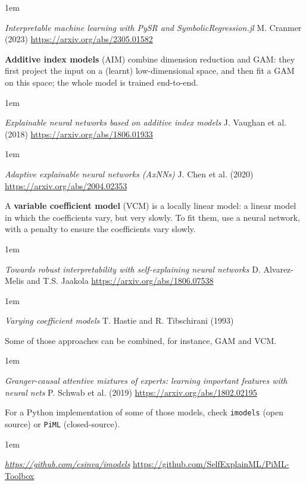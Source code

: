 \documentclass[a5paper]{article}
\let\d\textbf
\newenvironment{reference}{%
  \medskip\goodbreak
  \parskip 0pt
  \raggedright
  \leftskip 1em
  \obeylines
}{\par\medskip\goodbreak}
\begin{document}
\begin{reference}
  \emph{Interpretable machine learning with PySR and SymbolicRegression.jl}
  M. Cranmer (2023)
  \url{https://arxiv.org/abs/2305.01582}
\end{reference}

\d{Additive index models} (AIM) combine dimension reduction and GAM:
they first project the input on a (learnt) low-dimensional space,
and then fit a GAM on this space; the whole model is trained end-to-end.

\begin{reference}
  \emph{Explainable neural networks based on additive index models}
  J. Vaughan et al. (2018)
  \url{https://arxiv.org/abs/1806.01933}
\end{reference}

\begin{reference}
  \emph{Adaptive explainable neural networks (AxNNs)}
  J. Chen et al. (2020)
  \url{https://arxiv.org/abs/2004.02353}
\end{reference}

A \d{variable coefficient model} (VCM) is a locally linear model:
a linear model in which the coefficients vary, but very slowly.
To fit them, use a neural network,
with a penalty to ensure the coefficients vary slowly.

\begin{reference}
  \emph{Towards robust interpretability with self-explaining neural networks}
  D. Alvarez-Melis and T.S. Jaakola  
  \url{https://arxiv.org/abs/1806.07538}
\end{reference}

\begin{reference}
  \emph{Varying coefficient models}
  T. Hastie and R. Tibschirani (1993)
\end{reference}
  
Some of those approaches can be combined, for instance, GAM and VCM.

\begin{reference}
  \emph{Granger-causal attentive mixtures of experts: learning important features with neural nets}
  P. Schwab et al. (2019)
  \url{https://arxiv.org/abs/1802.02195}
\end{reference}

For a Python implementation of some of those models,
check \texttt{imodels} (open source) or \texttt{PiML} (closed-source).

\begin{reference}
  \emph{\url{https://github.com/csinva/imodels}}
  \url{https://github.com/SelfExplainML/PiML-Toolbox}
\end{reference}
\end{document}

